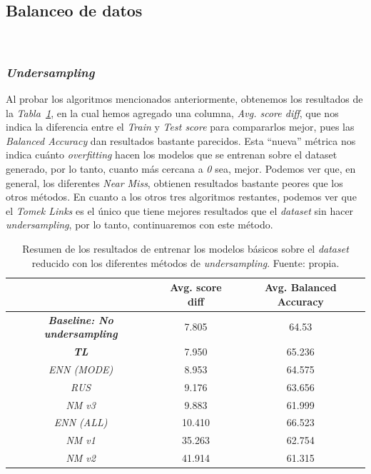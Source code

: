 \subsection{Balanceo de datos}\ \label{sec:i2-balance}

\subsubsection{\textit{Undersampling}}

Al probar los algoritmos mencionados anteriormente, obtenemos los resultados de la \textit{Tabla\ \ref{tab:undersampling-methods}}, en la cual hemos agregado una columna, \textit{Avg. score diff}, que nos indica la diferencia entre el \textit{Train} y \textit{Test score} para compararlos mejor, pues las \textit{Balanced Accuracy} dan resultados bastante parecidos. Esta ``nueva'' métrica nos indica cuánto \textit{overfitting} hacen los modelos que se entrenan sobre el dataset generado, por lo tanto, cuanto más cercana a \textit{0} sea, mejor. Podemos ver que, en general, los diferentes \textit{Near Miss}, obtienen resultados bastante peores que los otros métodos. En cuanto a los otros tres algoritmos restantes, podemos ver que el \textit{Tomek Links} es el único que tiene mejores resultados que el \textit{dataset} sin hacer \textit{undersampling}, por lo tanto, continuaremos con este método.

\begin{table}[!h]
    \centering
    \begin{tabular}{|c|cc|} \hline
        & Avg. score diff & Avg. Balanced Accuracy \\ \hline
        \textit{\textbf{Baseline: No undersampling}} & 7.805 & 64.53 \\ 
        \textit{\textbf{TL}} & 7.950 & 65.236 \\ 
        \textit{ENN (MODE)} & 8.953 & 64.575 \\ 
        \textit{RUS} & 9.176 & 63.656 \\ 
        \textit{NM v3} & 9.883 & 61.999 \\ 
        \textit{ENN (ALL)} & 10.410 & 66.523 \\ 
        \textit{NM v1} & 35.263 & 62.754 \\ 
        \textit{NM v2} & 41.914 & 61.315 \\ \hline
    \end{tabular}
    \caption{Resumen de los resultados de entrenar los modelos básicos sobre el \textit{dataset} reducido con los diferentes métodos de \textit{undersampling}. Fuente: propia.}\ \label{tab:undersampling-methods}
\end{table}

